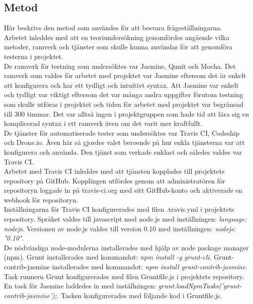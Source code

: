 \subsection{Metod}
Här beskrivs den metod som användes för att 
besvara frågeställningarna.\\

Arbetet inleddes med att en teoriundersökning genomfördes
angående vilka metoder, ramverk och tjänster som skulle kunna
användas för att genomföra testerna i projektet.\\

De ramverk för
testning som undersöktes var Jasmine, Qunit och Mocha. Det
ramverk som valdes för arbetet med projektet var Jasmine
eftersom det är enkelt att konfigurera och har ett 
tydligt och intuitivt syntax. Att Jasmine var enkelt och tydligt
var viktigt eftersom det var många andra uppgifter förutom
testning som skulle utföras i projektet och tiden för
arbetet med projektet var begränsad till 300 timmar. Det var
alltså ingen i projektgruppen som hade tid att lära sig 
en komplicerad syntax i ett ramverk även om det varit
mer kraftfullt.\\

De tjänster för automatiserade tester som undersöktes var
Travis CI, Codeship och Drone.io. Även här 
så gjordes valet beroende på hur enkla tjänsterna var att
konfigurera och använda. Den tjänst som verkade enklast
och således valdes var Travis CI.\\

Arbetet med Travis CI inleddes med att tjänsten kopplades till 
projektets repository på GitHub. Kopplingen utfördes
genom att administratören för repositoryn loggade in på travis-ci.org med 
sitt GitHub-konto och aktiverade
en webhook för repositoryn.\\

Inställningarna för Travis CI konfigurerades med filen .travis.yml i projektets
repository. Språket valdes till
javascript med node.js med inställningen: \emph{language: node\textunderscore js}.
Versionen av node.js valdes till version 0.10
med inställningen: \emph{node\textunderscore js: "0.10"}.\\

De nödvändiga node-modulerna installerades med hjälp av node package manager (npm).
Grunt installerades
med kommandot: \emph{npm install -g grunt-cli}. Grunt-contrib-jasmine installerades med kommandot: 
\emph{npm install grunt-contrib-jasmine}.\\

Task runnern Grunt konfigurerades med filen Gruntfile.js i projektets repository.
En task för Jasmine laddedes in med
inställningen: \emph{grunt.loadNpmTasks('grunt-contrib-jasmine');}.
Tasken konfigurerades med följande kod i Gruntfile.js.

